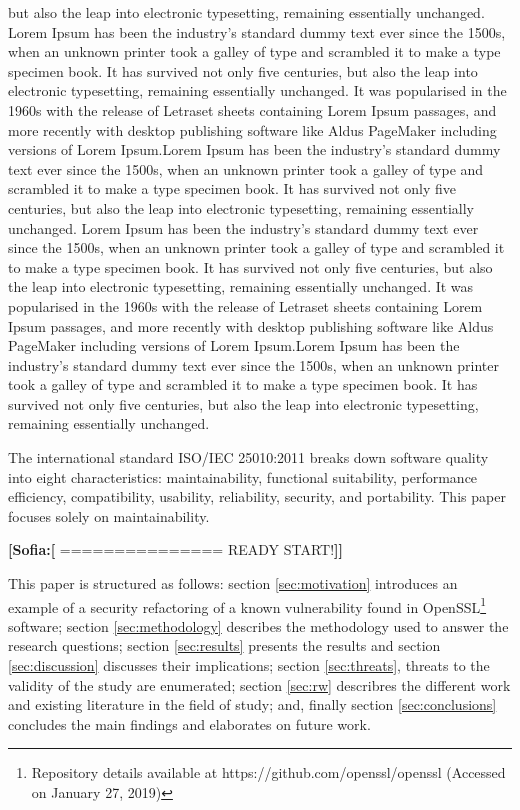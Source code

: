 \documentclass[10pt,conference]{IEEEtran}
\newcommand{\Sof}[1]{\textbf{[Sofia:[}{\color{red} #1}\textbf{]]}}
\begin{document}
but also the leap into electronic typesetting, remaining essentially unchanged. Lorem Ipsum has been the industry's standard dummy text ever since the 1500s, when an unknown printer took a galley of type and scrambled it to make a type specimen book. It has survived not only five centuries, but also the leap into electronic typesetting, remaining essentially unchanged. It was popularised in the 1960s with the release of Letraset sheets containing Lorem Ipsum passages, and more recently with desktop publishing software like Aldus PageMaker including versions of Lorem Ipsum.Lorem Ipsum has been the industry's standard dummy text ever since the 1500s, when an unknown printer took a galley of type and scrambled it to make a type specimen book. It has survived not only five centuries, but also the leap into electronic typesetting, remaining essentially unchanged. Lorem Ipsum has been the industry's standard dummy text ever since the 1500s, when an unknown printer took a galley of type and scrambled it to make a type specimen book. It has survived not only five centuries, but also the leap into electronic typesetting, remaining essentially unchanged. It was popularised in the 1960s with the release of Letraset sheets containing Lorem Ipsum passages, and more recently with desktop publishing software like Aldus PageMaker including versions of Lorem Ipsum.Lorem Ipsum has been the industry's standard dummy text ever since the 1500s, when an unknown printer took a galley of type and scrambled it to make a type specimen book. It has survived not only five centuries, but also the leap into electronic typesetting, remaining essentially unchanged. 

The international standard ISO/IEC 25010:2011 breaks down software quality into eight characteristics: maintainability,
functional suitability, performance efficiency, compatibility, usability, reliability, security,
and portability. This paper focuses solely on maintainability.

\Sof{=============== READY START!}

This paper is structured as follows: section \ref{sec:motivation} introduces an example of a security refactoring of a known vulnerability found in OpenSSL\footnote{Repository details available at https://github.com/openssl/openssl (Accessed on January 27, 2019)} software; section \ref{sec:methodology} describes the methodology used to answer the research questions; section \ref{sec:results} presents the results and section \ref{sec:discussion} discusses their implications; section \ref{sec:threats}, threats to the validity of the study are enumerated; section \ref{sec:rw} describres the different work and existing literature in the field of study; and, finally section \ref{sec:conclusions} concludes the main findings and elaborates on future work.
\end{document}
